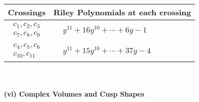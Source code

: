\documentclass[1p]{elsarticle_modified}
\theoremstyle{definition}
\begin{document}
\begin{tabular}{m{50pt}|m{274pt}}
Crossings & \hspace{64pt}Riley Polynomials at each crossing \\
\hline $$\begin{aligned}c_{1},c_{2},c_{3}\\c_{7},c_{8},c_{9}\end{aligned}$$&$\begin{aligned}
&y^{11}+16 y^{10}+\cdots+6 y-1
\end{aligned}$\\
\hline $$\begin{aligned}c_{4},c_{5},c_{6}\\c_{10},c_{11}\end{aligned}$$&$\begin{aligned}
&y^{11}+15 y^{10}+\cdots+37 y-4
\end{aligned}$\\
\hline
\end{tabular}\\~\\
\newpage\flushleft \textbf{(vi) Complex Volumes and Cusp Shapes}
\end{document}
